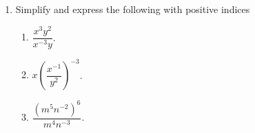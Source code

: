 \documentclass[11pt]{article}
\begin{document}
\begin{enumerate}
            \hrulefill
            
            \hrulefill
            
            \hrulefill
            
            \hrulefill
            
            \hrulefill
            
            \hrulefill
            
            \hrulefill
            
            \hrulefill

            \hrulefill
            
            \hrulefill
            
            \hrulefill
            
            \hrulefill

            \hrulefill
            
            \hrulefill
            
            \hrulefill
            
            \hrulefill
            
            \hrulefill

        \pagebreak
        \item Simplify and express the following with positive indices\begin{enumerate}
            \item $\dfrac{x^3y^2}{x^{-3}y}$.
            \item $x(\dfrac{x^{-1}}{y^2})^{-3}$.
            \item $\dfrac{(m^5n^{-2})^6}{m^4n^{-3}}$.
        \end{enumerate}

        \hrulefill
            
            \hrulefill
            
            \hrulefill
            
            \hrulefill
            
            \hrulefill
            
            \hrulefill
            
            \hrulefill
            
            \hrulefill
            
            \hrulefill
            
            \hrulefill

            \hrulefill
                

\end{enumerate}
\end{document}
